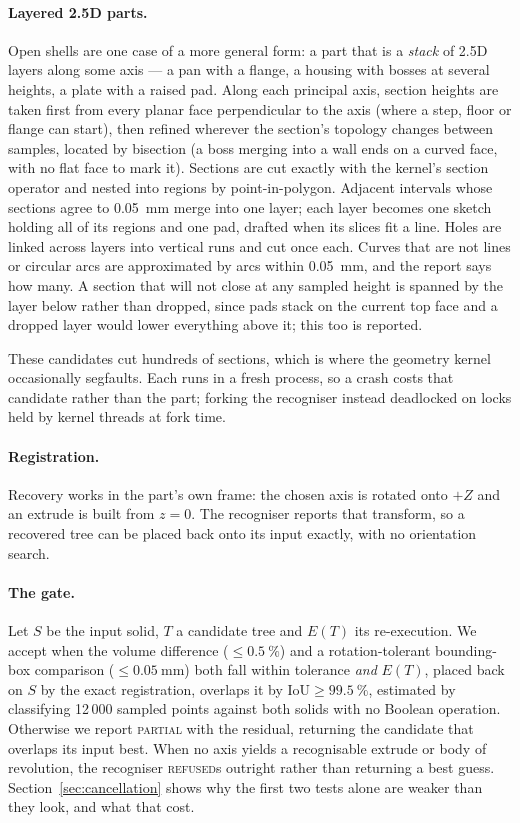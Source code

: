 \documentclass[11pt]{article}
\newcommand{\PARTIAL}{\textsc{partial}}
\newcommand{\REFUSED}{\textsc{refused}}
\begin{document}
\paragraph{Layered 2.5D parts.} Open shells are one case of a more general
form: a part that is a \emph{stack} of 2.5D layers along some axis --- a pan with
a flange, a housing with bosses at several heights, a plate with a raised pad.
Along each principal axis, section heights are taken first from every planar
face perpendicular to the axis (where a step, floor or flange can start), then
refined wherever the section's topology changes between samples, located by
bisection (a boss merging into a wall ends on a curved face, with no flat face
to mark it). Sections are cut exactly with the kernel's section operator and
nested into regions by point-in-polygon. Adjacent intervals whose sections agree
to \SI{0.05}{\milli\metre} merge into one layer; each layer becomes one sketch
holding all of its regions and one pad, drafted when its slices fit a line.
Holes are linked across layers into vertical runs and cut once each. Curves that
are not lines or circular arcs are approximated by arcs within
\SI{0.05}{\milli\metre}, and the report says how many. A section that will not
close at any sampled height is spanned by the layer below rather than dropped,
since pads stack on the current top face and a dropped layer would lower
everything above it; this too is reported.

These candidates cut hundreds of sections, which is where the geometry kernel
occasionally segfaults. Each runs in a fresh process, so a crash costs that
candidate rather than the part; forking the recogniser instead deadlocked on
locks held by kernel threads at fork time.

\paragraph{Registration.} Recovery works in the part's own frame: the chosen
axis is rotated onto $+Z$ and an extrude is built from $z=0$. The recogniser
reports that transform, so a recovered tree can be placed back onto its input
exactly, with no orientation search.

\paragraph{The gate.} Let $S$ be the input solid, $T$ a candidate tree and
$E(T)$ its re-execution. We accept when the volume difference
($\le\SI{0.5}{\percent}$) and a rotation-tolerant bounding-box comparison
($\le\SI{0.05}{\milli\metre}$) both fall within tolerance \emph{and} $E(T)$,
placed back on $S$ by the exact registration, overlaps it by
$\mathrm{IoU}\ge\SI{99.5}{\percent}$, estimated by classifying 12\,000 sampled
points against both solids with no Boolean operation. Otherwise we report
\PARTIAL{} with the residual, returning the candidate that overlaps its input
best. When no axis yields a recognisable
extrude or body of revolution, the recogniser \REFUSED{}s outright rather than
returning a best guess. Section~\ref{sec:cancellation} shows why the first two
tests alone are weaker than they look, and what that cost.
\end{document}
